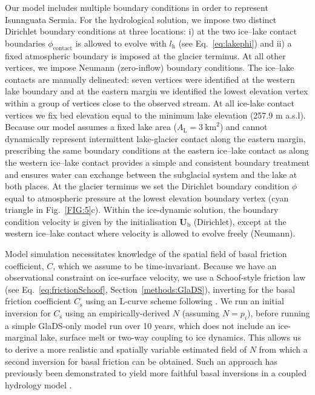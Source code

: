 \documentclass[tc, manuscript]{copernicus}
\begin{document}
Our model includes multiple boundary conditions in order to represent Isunnguata Sermia. For the hydrological solution, we impose two distinct Dirichlet boundary conditions at three locations: i) at the two ice--lake contact boundaries $\phi_{\mathrm{contact}}$ is allowed to evolve with $l_{\mathrm{h}}$ (see Eq.~\ref{eq:lakephi}) and ii) a fixed atmospheric boundary is imposed at the glacier terminus. At all other vertices, we impose Neumann (zero-inflow) boundary conditions. The ice--lake contacts are manually delineated: seven vertices were identified at the western lake boundary and at the eastern margin we identified the lowest elevation vertex within a group of vertices close to the observed stream. At all ice-lake contact vertices we fix bed elevation equal to the minimum lake elevation (257.9 m a.s.l). Because our model assumes a fixed lake area ($A_{\mathrm{L}}=3\ \mathrm{km}^2$) and cannot dynamically represent intermittent lake-glacier contact along the eastern margin, prescribing the same boundary conditions at the eastern ice--lake contact as along the western ice--lake contact provides a simple and consistent boundary treatment and ensures water can exchange between the subglacial system and the lake at both places. At the glacier terminus we set the Dirichlet boundary condition $\phi$ equal to atmospheric pressure at the lowest elevation boundary vertex (cyan triangle in Fig.~\ref{FIG:5}c). Within the ice-dynamic solution, the boundary condition velocity is given by the initialisation $\mathbf{U}_{\mathrm{b}}$ (Dirichlet), except at the western ice--lake contact where velocity is allowed to evolve freely (Neumann). 

Model simulation necessitates knowledge of the spatial field of basal friction coefficient, $C$, which we assume to be time-invariant. Because we have an observational constraint on ice-surface velocity, we use a Schoof-style friction law (see Eq.~\ref{eq:frictionSchoof}, Section~\ref{methods:GlaDS}), inverting for the basal friction coefficient $C_{\mathrm{s}}$ using an L-curve scheme following \citet{wolovick2023regularization}. We run an initial inversion for $C_{\mathrm{s}}$ using an empirically-derived $N$ (assuming $N=p_{i}$), before running a simple GlaDS-only model run over 10 years, which does not include an ice-marginal lake, surface melt or two-way coupling to ice dynamics. This allows us to derive a more realistic and spatially variable estimated field of $N$ from which a second inversion for basal friction can be obtained. Such an approach has previously been demonstrated to yield more faithful basal inversions in a coupled hydrology model \citep{ehrenfeucht2023seasonal,mcarthur2023basal}. 
\end{document}
